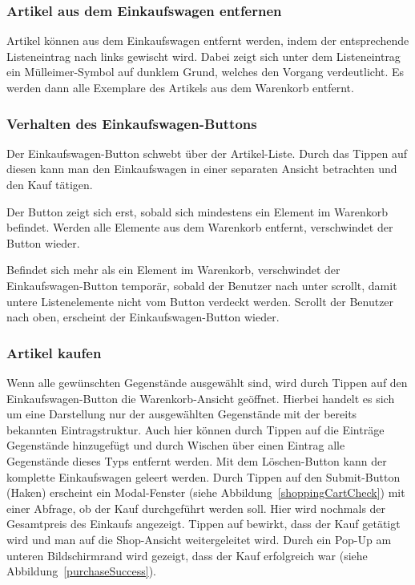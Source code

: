 \subsubsection{Artikel aus dem Einkaufswagen entfernen} \label{subsubsec:shoppingcart-del-item}

Artikel können aus dem Einkaufswagen entfernt werden, indem der entsprechende Listeneintrag nach links gewischt wird.
Dabei zeigt sich unter dem Listeneintrag ein Mülleimer-Symbol auf dunklem Grund, welches den Vorgang verdeutlicht.
Es werden dann alle Exemplare des Artikels aus dem Warenkorb entfernt.

\subsubsection{Verhalten des Einkaufswagen-Buttons} \label{subsubsec:shoppingcart-button}

Der Einkaufswagen-Button schwebt über der Artikel-Liste.
Durch das Tippen auf diesen kann man den Einkaufswagen in einer separaten Ansicht betrachten und den Kauf tätigen.

Der Button zeigt sich erst, sobald sich mindestens ein Element im Warenkorb befindet.
Werden alle Elemente aus dem Warenkorb entfernt, verschwindet der Button wieder.

Befindet sich mehr als ein Element im Warenkorb, verschwindet der Einkaufswagen-Button temporär, sobald der Benutzer nach unter scrollt, damit untere Listenelemente nicht vom Button verdeckt werden.
Scrollt der Benutzer nach oben, erscheint der Einkaufswagen-Button wieder.

\subsubsection{Artikel kaufen} \label{subsubsec:shop-buy}

Wenn alle gewünschten Gegenstände ausgewählt sind, wird durch Tippen auf den Einkaufswagen-Button die Warenkorb-Ansicht geöffnet.
Hierbei handelt es sich um eine Darstellung nur der ausgewählten Gegenstände mit der bereits bekannten Eintragstruktur.
Auch hier können durch Tippen auf die Einträge Gegenstände hinzugefügt und durch Wischen über einen Eintrag alle Gegenstände dieses Typs entfernt werden.
Mit dem Löschen-Button kann der komplette Einkaufswagen geleert werden.
Durch Tippen auf den Submit-Button (Haken) erscheint ein Modal-Fenster (siehe Abbildung~\ref{shoppingCartCheck}) mit einer Abfrage, ob der Kauf durchgeführt werden soll.
Hier wird nochmals der Gesamtpreis des Einkaufs angezeigt.
Tippen auf  bewirkt, dass der Kauf getätigt wird und man auf die Shop-Ansicht weitergeleitet wird.
Durch ein Pop-Up am unteren Bildschirmrand wird gezeigt, dass der Kauf erfolgreich war (siehe Abbildung~\ref{purchaseSuccess}).

